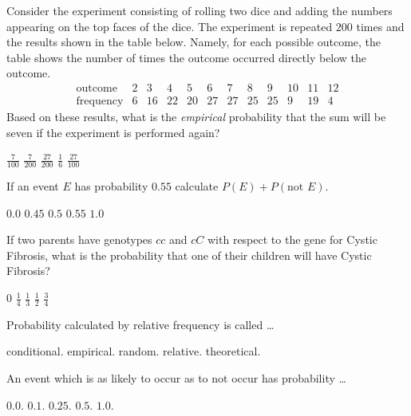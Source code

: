 \documentclass[12pt]{exam}
\begin{document}
\begin{questions}
\newpage
\question Consider the experiment consisting
of rolling two dice and adding the numbers
appearing on the top faces of the dice.
The experiment is repeated $200$ times and the
results shown in the table below. Namely, 
for each possible outcome, the table shows the number
of times the outcome occurred directly below the outcome.
\[\begin{array}{r|ccccccccccc}
\text{outcome}&2&3&4&5&6&7&8&9&10&11&12\\\hline
\text{frequency}&6&16&22&20&27&27&25&25&9&19&4
\end{array}\]
Based on these results, what is the {\em empirical} probability
that the sum will be seven if the experiment is performed again?\\
\begin{oneparchoices}
\choice $\frac{7}{100}$
\choice $\frac{7}{200}$
\choice $\frac{27}{200}$
\choice $\frac{1}{6}$
\choice $\frac{27}{100}$
\end{oneparchoices}

\question If an event $E$ has probability $0.55$
calculate $P\left(E\right)+P\left(\text{not $E$}\right)$.\\
\begin{oneparchoices}
\choice $0.0$
\choice $0.45$
\choice $0.5$
\choice $0.55$
\choice $1.0$
\end{oneparchoices}

\question If two parents have genotypes $cc$ and $cC$
with respect to the gene for Cystic Fibrosis, what
is the probability that one of their children will have
Cystic Fibrosis?\\
\begin{oneparchoices}
\choice $0$
\choice $\frac{1}{4}$
\choice $\frac{1}{3}$
\choice $\frac{1}{2}$
\choice $\frac{3}{4}$
\end{oneparchoices}

\question Probability calculated by relative frequency is called \dots\\
\begin{oneparchoices}
\choice conditional.
\choice empirical.
\choice random.
\choice relative.
\choice theoretical.
\end{oneparchoices}

\question An event which is as likely to occur as to not occur has probability \dots\\
\begin{oneparchoices}
\choice $0.0$.
\choice $0.1$.
\choice $0.25$.
\choice $0.5$.
\choice $1.0$.
\end{oneparchoices}

\end{questions}
\end{document}
